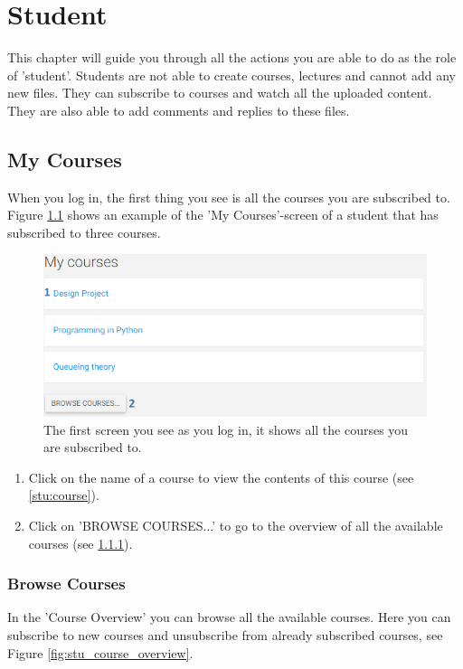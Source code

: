 \documentclass[a4paper,11pt]{report}
\begin{document}
\chapter{Student}
This chapter will guide you through all the actions you are able to do as the role of 'student'. Students are not able to create courses, lectures and cannot add any new files. They can subscribe to courses and watch all the uploaded content. They are also able to add comments and replies to these files.
\section{My Courses}
\label{stu:my_courses}
When you log in, the first thing you see is all the courses you are subscribed to. Figure \ref{fig:stu_my_courses} shows an example of the 'My Courses'-screen of a student that has subscribed to three courses.

\begin{figure}[H]
\centering
\includegraphics[scale=0.55]{imgs/stu_my_courses.png}
\caption{The first screen you see as you log in, it shows all the courses you are subscribed to.}
\label{fig:stu_my_courses}
\end{figure}
\begin{enumerate}
\item Click on the name of a course to view the contents of this course (see \ref{stu:course}).
\item Click on 'BROWSE COURSES...' to go to the overview of all the available courses (see \ref{stu:browse}).
\end{enumerate}

\subsection{Browse Courses}
\label{stu:browse}
In the 'Course Overview' you can browse all the available courses. Here you can subscribe to new courses and unsubscribe from already subscribed courses, see Figure \ref{fig:stu_course_overview}.
\end{document}
